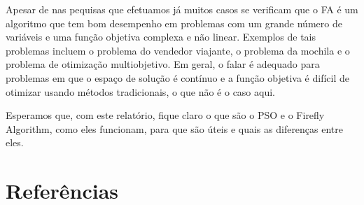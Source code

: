 \documentclass[10pt]{article}
\begin{document}
Apesar de nas pequisas que efetuamos já muitos casos
se verificam que o FA é um algoritmo que tem bom desempenho em 
problemas com um grande número de variáveis e uma função objetiva 
complexa e não linear. 
Exemplos de tais problemas incluem o problema do vendedor viajante,
o problema da mochila e o problema de otimização multiobjetivo. 
Em geral, o falar é adequado para problemas em que o espaço de 
solução é contínuo e a função objetiva é difícil de otimizar 
usando métodos tradicionais, o que não é o caso aqui.

Esperamos que, com este relatório, fique claro o que são o 
PSO e o Firefly Algorithm, como eles funcionam, para que são 
úteis e quais as diferenças entre eles. 
\vspace{1cm}

\section{Referências}\label{sec:sup-inf-utl}


\nocite{FirePso}
\nocite{Firefly_par}



\pagebreak
\end{document}
